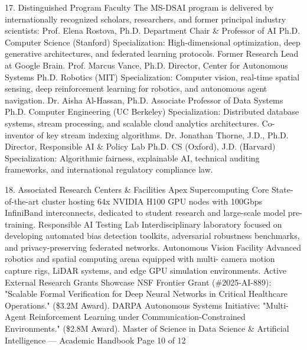 17. Distinguished Program Faculty
The MS-DSAI program is delivered by internationally recognized scholars, researchers, and former principal industry
scientists:
Prof. Elena Rostova, Ph.D.
Department Chair \& Professor of AI
Ph.D. Computer Science (Stanford)
Specialization: High-dimensional optimization, deep generative
architectures, and federated learning protocols. Former
Research Lead at Google Brain.
Prof. Marcus Vance, Ph.D.
Director, Center for Autonomous Systems
Ph.D. Robotics (MIT)
Specialization: Computer vision, real-time spatial sensing, deep
reinforcement learning for robotics, and autonomous agent
navigation.
Dr. Aisha Al-Hassan, Ph.D.
Associate Professor of Data Systems
Ph.D. Computer Engineering (UC Berkeley)
Specialization: Distributed database systems, stream
processing, and scalable cloud analytics architectures. Co-
inventor of key stream indexing algorithms.
Dr. Jonathan Thorne, J.D., Ph.D.
Director, Responsible AI \& Policy Lab
Ph.D. CS (Oxford), J.D. (Harvard)
Specialization: Algorithmic fairness, explainable AI, technical
auditing frameworks, and international regulatory compliance
law.

18. Associated Research Centers \& Facilities
Apex Supercomputing Core
State-of-the-art cluster hosting 64x
NVIDIA H100 GPU nodes with 100Gbps
InfiniBand interconnects, dedicated to
student research and large-scale model
pre-training.
Responsible AI Testing Lab
Interdisciplinary laboratory focused on
developing automated bias detection
toolkits, adversarial robustness
benchmarks, and privacy-preserving
federated networks.
Autonomous Vision Facility
Advanced robotics and spatial
computing arena equipped with multi-
camera motion capture rigs, LiDAR
systems, and edge GPU simulation
environments.
Active External Research Grants Showcase
NSF Frontier Grant (\#2025-AI-889): "Scalable Formal Verification for Deep Neural Networks in Critical Healthcare
Operations." (\$3.2M Award).
DARPA Autonomous Systems Initiative: "Multi-Agent Reinforcement Learning under Communication-Constrained
Environments." (\$2.8M Award).
Master of Science in Data Science \& Artificial Intelligence — Academic Handbook
Page 10 of 12
